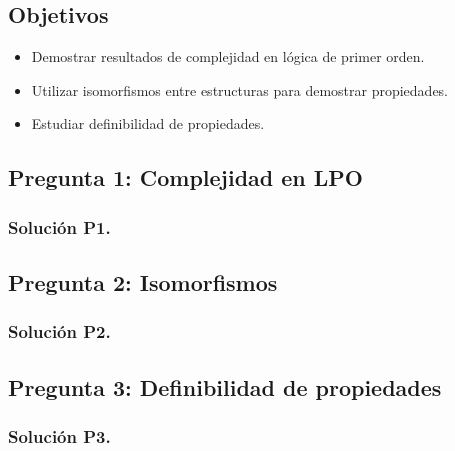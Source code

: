 \documentclass{article}
\begin{document}
\subsection*{Objetivos}
\begin{itemize}
    \item Demostrar resultados de complejidad en lógica de primer orden.
    \item Utilizar isomorfismos entre estructuras para demostrar propiedades.
    \item Estudiar definibilidad de propiedades.
\end{itemize}

\subsection*{Pregunta 1: Complejidad en LPO}

\subsubsection*{Solución P1.}

\newpage

\subsection*{Pregunta 2: Isomorfismos}

\subsubsection*{Solución P2.}

\newpage

\subsection*{Pregunta 3: Definibilidad de propiedades}

\subsubsection*{Solución P3.}

\end{document}
